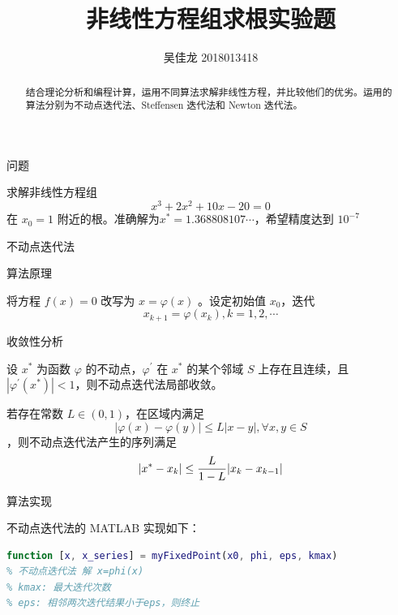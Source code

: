 \documentclass[a4paper]{article}
\providecommand{\keywords}[1]{\textbf{\textit{关键词}} #1}
\begin{document}
 
\title{非线性方程组求根实验题}
\author{吴佳龙 2018013418}
\date{}
\maketitle

\begin{abstract}
	结合理论分析和编程计算，运用不同算法求解非线性方程，并比较他们的优劣。运用的算法分别为不动点迭代法、Steffensen 迭代法和 Newton 迭代法。
\end{abstract}


\begin{multicols}{2}

\begin{section}{问题}

	求解非线性方程组 \begin{equation}
		x^{3}+2 x^{2}+10 x-20=0
		\label{equ}
	\end{equation} 在 $x_0=1$ 附近的根。准确解为$x^{*}=1.368808107 \cdots$，希望精度达到 $10^{-7}$
	
\end{section}

\begin{section}{不动点迭代法}

	\begin{subsection}{算法原理}
		
		将方程 $f(x)=0$ 改写为 $x=\varphi(x)$ 。设定初始值 $x_0$，迭代 $$x_{k+1} = \varphi(x_k), k=1,2,\cdots$$
		
	\end{subsection}

	\begin{subsection}{收敛性分析}
		
		设 $x^*$ 为函数 $\varphi$ 的不动点，$\varphi^\prime$ 在 $x^*$ 的某个邻域 $S$ 上存在且连续，且 $|\varphi^\prime (x^*)|<1$，则不动点迭代法局部收敛。
		
		若存在常数 $L\in (0,1)$，在区域内满足 $$|\varphi(x) - \varphi(y)|\leq L|x-y|, \forall x,y\in S$$，则不动点迭代法产生的序列满足 $$|x^* - x_k| \leq {L \over 1-L} |x_{k}-x_{k-1}|$$
		
	\end{subsection}
	
	\begin{subsection}{算法实现}
		
		不动点迭代法的 MATLAB 实现如下：
		
		\begin{lstlisting}[language=Matlab]
function [x, x_series] = myFixedPoint(x0, phi, eps, kmax)
% 不动点迭代法 解 x=phi(x)
% kmax: 最大迭代次数
% eps: 相邻两次迭代结果小于eps，则终止


\end{lstlisting}
\end{subsection}
\end{section}
\end{multicols}
\end{document}
